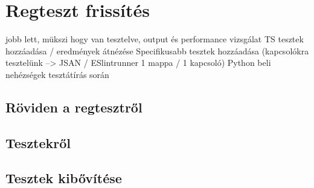 \chapter*{Regteszt frissítés}
jobb lett, mükszi
hogy van tesztelve, output és performance vizsgálat
TS tesztek hozzáadása / eredmények átnézése
Specifikusabb tesztek hozzáadása (kapcsolókra tesztelünk --> JSAN / ESlintrunner 1 mappa / 1 kapcsoló)
Python beli nehézségek tesztátírás során

\section{Röviden a regtesztről}

\section{Tesztekről}

\section{Tesztek kibővítése}